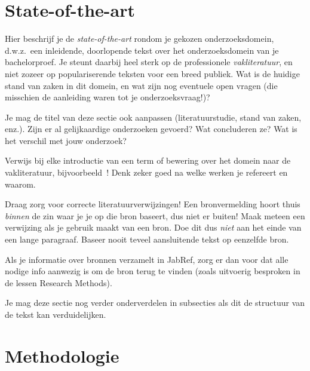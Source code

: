 
\section{State-of-the-art}%
\label{sec:state-of-the-art}

Hier beschrijf je de \emph{state-of-the-art} rondom je gekozen onderzoeksdomein, d.w.z.\ een inleidende, doorlopende tekst over het onderzoeksdomein van je bachelorproef. Je steunt daarbij heel sterk op de professionele \emph{vakliteratuur}, en niet zozeer op populariserende teksten voor een breed publiek. Wat is de huidige stand van zaken in dit domein, en wat zijn nog eventuele open vragen (die misschien de aanleiding waren tot je onderzoeksvraag!)?

Je mag de titel van deze sectie ook aanpassen (literatuurstudie, stand van zaken, enz.). Zijn er al gelijkaardige onderzoeken gevoerd? Wat concluderen ze? Wat is het verschil met jouw onderzoek?

Verwijs bij elke introductie van een term of bewering over het domein naar de vakliteratuur, bijvoorbeeld~\autocite{Hykes2013}! Denk zeker goed na welke werken je refereert en waarom.

Draag zorg voor correcte literatuurverwijzingen! Een bronvermelding hoort thuis \emph{binnen} de zin waar je je op die bron baseert, dus niet er buiten! Maak meteen een verwijzing als je gebruik maakt van een bron. Doe dit dus \emph{niet} aan het einde van een lange paragraaf. Baseer nooit teveel aansluitende tekst op eenzelfde bron.

Als je informatie over bronnen verzamelt in JabRef, zorg er dan voor dat alle nodige info aanwezig is om de bron terug te vinden (zoals uitvoerig besproken in de lessen Research Methods).


Je mag deze sectie nog verder onderverdelen in subsecties als dit de structuur van de tekst kan verduidelijken.

\section{Methodologie}%
\label{sec:methodologie}

